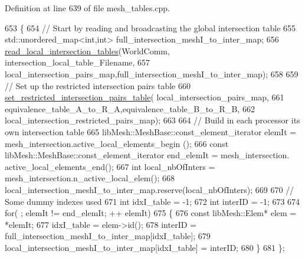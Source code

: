 Definition at line 639 of file mesh\+\_\+tables.\+cpp.


\begin{DoxyCode}
653 \{
654     \textcolor{comment}{//  Start by reading and broadcasting the global intersection table}
655     std::unordered\_map<int,int> full\_intersection\_meshI\_to\_inter\_map;
656     \hyperlink{namespacecarl_aeceaf9a878847b9ea2f623aa51e3b392}{read\_local\_intersection\_tables}(WorldComm,
      intersection\_local\_table\_Filename,
657             local\_intersection\_pairs\_map,full\_intersection\_meshI\_to\_inter\_map);
658 
659     \textcolor{comment}{// Set up the restricted intersection pairs table}
660     \hyperlink{namespacecarl_a17eb70b3f2c2574e7b3085108205e38c}{set\_restricted\_intersection\_pairs\_table}(
      local\_intersection\_pairs\_map,
661         equivalence\_table\_A\_to\_R\_A,equivalence\_table\_B\_to\_R\_B,
662         local\_intersection\_restricted\_pairs\_map);
663 
664     \textcolor{comment}{// Build in each processor its own intersection table}
665     libMesh::MeshBase::const\_element\_iterator       elemIt  = mesh\_intersection.active\_local\_elements\_begin
      ();
666     \textcolor{keyword}{const} libMesh::MeshBase::const\_element\_iterator end\_elemIt = mesh\_intersection.
      active\_local\_elements\_end();
667     \textcolor{keywordtype}{int} local\_nbOfInters = mesh\_intersection.n\_active\_local\_elem();
668     local\_intersection\_meshI\_to\_inter\_map.reserve(local\_nbOfInters);
669 
670     \textcolor{comment}{// Some dummy indexes used}
671     \textcolor{keywordtype}{int} idxI\_table = -1;
672     \textcolor{keywordtype}{int} interID = -1;
673 
674     \textcolor{keywordflow}{for}( ; elemIt != end\_elemIt; ++ elemIt)
675     \{
676         \textcolor{keyword}{const} libMesh::Elem* elem = *elemIt;
677         idxI\_table  = elem->id();
678         interID     = full\_intersection\_meshI\_to\_inter\_map[idxI\_table];
679         local\_intersection\_meshI\_to\_inter\_map[idxI\_table] = interID;
680     \}
681 \};
\end{DoxyCode}
\hypertarget{namespacecarl_a17eb70b3f2c2574e7b3085108205e38c}{}
